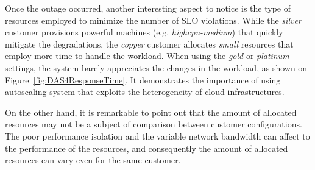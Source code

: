 Once the outage occurred, another interesting aspect to notice is the type of resources employed to minimize the number of SLO violations. While the \emph{silver} customer provisions powerful machines (e.g. \emph{highcpu-medium}) that quickly mitigate the degradations, the \emph{copper} customer allocates \emph{small} resources that employ more time to handle the workload. When using the \emph{gold} or \emph{platinum} settings, the system barely appreciates the changes in the workload, as shown on Figure~\ref{fig:DAS4ResponseTime}. It demonstrates the importance of using autoscaling system that exploits the heterogeneity of cloud infrastructures.


On the other hand, it is remarkable to point out that the amount of allocated resources may not be a subject of comparison between customer configurations. The poor performance isolation and the variable network bandwidth can affect to the performance of the resources, and consequently the amount of allocated resources can vary even for the same customer.




